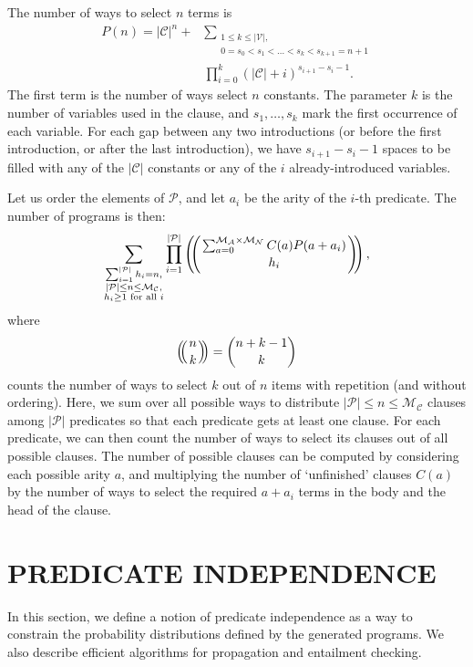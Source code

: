 \documentclass[letterpaper]{article}
\theoremstyle{definition}
\newcommand{\predicates}{\mathcal{P}}
\newcommand{\variables}{\mathcal{V}}
\newcommand{\constants}{\mathcal{C}}
\newcommand{\maxArity}{\mathcal{M}_{\mathcal{A}}}
\newcommand{\maxNumNodes}{\mathcal{M}_{\mathcal{N}}}
\newcommand{\maxNumClauses}{\mathcal{M}_{\mathcal{C}}}
\def\multiset#1#2{\ensuremath{\left(\kern-.3em\left(\genfrac{}{}{0pt}{}{#1}{#2}\right)\kern-.3em\right)}}
\begin{document}
The number of ways to select $n$ terms is
\begin{align*}
  P(n) = |\constants{}|^n + &\sum_{\substack{1 \le k \le |\variables{}|, \\ 0 =
      s_0 < s_1 < \dots < s_k < s_{k+1} = n+1}}\\
  &\prod_{i=0}^k (|\constants{}| + i)^{s_{i+1} - s_i - 1}.
\end{align*}
The first term is the number of ways select $n$ constants. The parameter $k$ is
the number of variables used in the clause, and $s_1, \dots, s_k$ mark the first
occurrence of each variable. For each gap between any two introductions (or
before the first introduction, or after the last introduction), we have
$s_{i+1}-s_i-1$ spaces to be filled with any of the $|\constants{}|$ constants
or any of the $i$ already-introduced variables.

Let us order the elements of $\predicates{}$, and let $a_i$ be the arity of the
$i$-th predicate. The number of programs is then:
\[
  \sum_{\substack{ \sum_{i=1}^{|\predicates{}|} h_i = n,\\
      |\predicates{}| \le n \le \maxNumClauses,\\
      h_i \ge 1 \text{ for all } i}} \prod_{i=1}^{|\predicates{}|}
  \multiset{\sum_{a=0}^{\maxArity{} \times \maxNumNodes{}} C(a) P(a+a_i)}{h_i},
\]
where
\[
  \multiset{n}{k} = \binom{n+k-1}{k}
\]
counts the number of ways to select $k$ out of $n$ items with repetition (and
without ordering). Here, we sum over all possible ways to distribute
$|\predicates{}| \le n \le \maxNumClauses{}$ clauses among $|\predicates{}|$
predicates so that each predicate gets at least one clause. For each predicate,
we can then count the number of ways to select its clauses out of all possible
clauses. The number of possible clauses can be computed by considering each
possible arity $a$, and multiplying the number of `unfinished' clauses $C(a)$ by
the number of ways to select the required $a+a_i$ terms in the body and the head
of the clause.

\section{PREDICATE INDEPENDENCE} \label{sec:independence}

In this section, we define a notion of predicate independence as a way to
constrain the probability distributions defined by the generated programs. We
also describe efficient algorithms for propagation and entailment checking.
\end{document}
